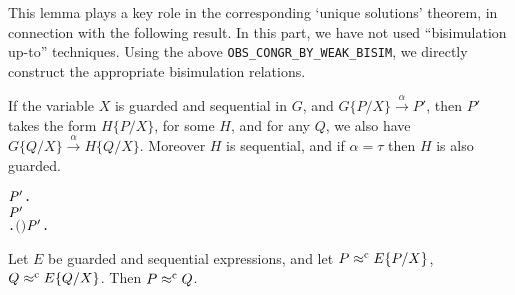 This lemma plays a key role in the
corresponding `unique solutions' theorem, in connection with the
following result. 
In this part, we have not 
used 
 ``bisimulation up-to'' techniques. Using
 the  above \texttt{OBS_CONGR_BY_WEAK_BISIM},
 we  directly construct the appropriate bisimulation relations.
\begin{lemma}
If the variable $X$ is guarded and sequential in $G$, and
$G\{P/X\}\overset{\alpha}{\rightarrow} P'$, then $P'$ takes the form
$H\{P/X\}$, for some  $H$, and for any $Q$, we also have 
$G\{Q/X\}\overset{\alpha}{\rightarrow} H\{Q/X\}$. Moreover $H$ is
sequential, and if $\alpha = \tau$ then $H$ is also guarded.
\begin{alltt}
\HOLTokenTurnstile{}   \HOLSymConst{\HOLTokenConj{}}   \HOLSymConst{\HOLTokenImp{}}
   \HOLSymConst{\HOLTokenForall{}}  \ensuremath{\HOLBoundVar{P}\sp{\prime}}.
         \HOLTokenTransBegin{}\HOLTokenTransEnd \ensuremath{\HOLBoundVar{P}\sp{\prime}} \HOLSymConst{\HOLTokenImp{}}
       \HOLSymConst{\HOLTokenExists{}}.   \HOLSymConst{\HOLTokenConj{}} \ensuremath{(} \HOLSymConst{\ensuremath{=}} \HOLSymConst{\ensuremath{\tau}} \HOLSymConst{\HOLTokenImp{}}  \ensuremath{)} \HOLSymConst{\HOLTokenConj{}} \ensuremath{\HOLBoundVar{P}\sp{\prime}} \HOLSymConst{\ensuremath{=}}   \HOLSymConst{\HOLTokenConj{}} \HOLSymConst{\HOLTokenForall{}}.   \HOLTokenTransBegin{}\HOLTokenTransEnd {} 
\end{alltt}
\end{lemma}

\begin{theorem}
Let $E$ be guarded and sequential expressions, and let $P \mathrel{\approx^{\rm{c}}}
E\{P/X\}$,
$Q \mathrel{\approx^{\rm{c}}} E\{Q/X\}$. Then $P \mathrel{\approx^{\rm{c}}} Q$.
\begin{alltt}
\HOLTokenTurnstile{}   \HOLSymConst{\HOLTokenConj{}}   \HOLSymConst{\HOLTokenConj{}}  \HOLSymConst{\HOLTokenObsCongr}   \HOLSymConst{\HOLTokenConj{}}  \HOLSymConst{\HOLTokenObsCongr}   \HOLSymConst{\HOLTokenImp{}}  \HOLSymConst{\HOLTokenObsCongr} 
\end{alltt}
\end{theorem}

